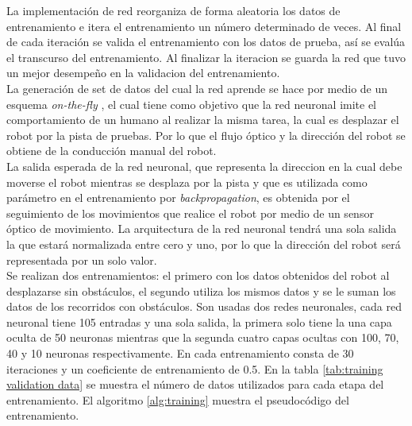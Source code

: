\documentclass{iccmemoria}
\begin{document}
La implementación de red reorganiza de forma aleatoria los datos de entrenamiento e itera el entrenamiento un número determinado de veces. Al final de cada iteración se valida el entrenamiento con los datos de prueba, así se evalúa el transcurso del entrenamiento. Al finalizar la iteracion se guarda la red que tuvo un mejor desempeño en la validacion del entrenamiento.\\

La generación de set de datos del cual la red aprende se hace por medio de un esquema \emph{on-the-fly} \cite{pomerleau1989alvinn}, el cual tiene como objetivo que la red neuronal imite el comportamiento de un humano al realizar la misma tarea, la cual es desplazar el robot por la pista de pruebas. Por lo que el flujo óptico y la dirección del robot se obtiene de la conducción manual del robot.\\

La salida esperada de la red neuronal, que representa la direccion en la cual debe moverse el robot mientras se desplaza por la pista y que es utilizada como parámetro en el entrenamiento por \emph{backpropagation}, es obtenida por el seguimiento de los movimientos que realice el robot por medio de un sensor óptico de movimiento. La arquitectura de la red neuronal tendrá una sola salida la que estará normalizada entre cero y uno, por lo que la dirección del robot será representada por un solo valor.\\

Se realizan dos entrenamientos: el primero con los datos obtenidos del robot al desplazarse sin obstáculos, el segundo utiliza los mismos datos y se le suman los datos de los recorridos con obstáculos. Son usadas dos redes neuronales, cada red neuronal tiene 105 entradas y una sola salida, la primera solo tiene la una capa oculta de 50 neuronas mientras que la segunda cuatro capas ocultas con 100, 70, 40 y 10 neuronas respectivamente. En cada entrenamiento consta de 30 iteraciones y un coeficiente de entrenamiento de 0.5. En la tabla \ref{tab:training validation data} se muestra el número de datos utilizados para cada etapa del entrenamiento. El algoritmo \ref{alg:training} muestra el pseudocódigo del entrenamiento.\\

\begin{table}[H]
\caption[Datos de entrenamiento y validación]{Datos de entrenamiento y validación}
\label{tab:training validation data}
\end{table}
\end{document}
